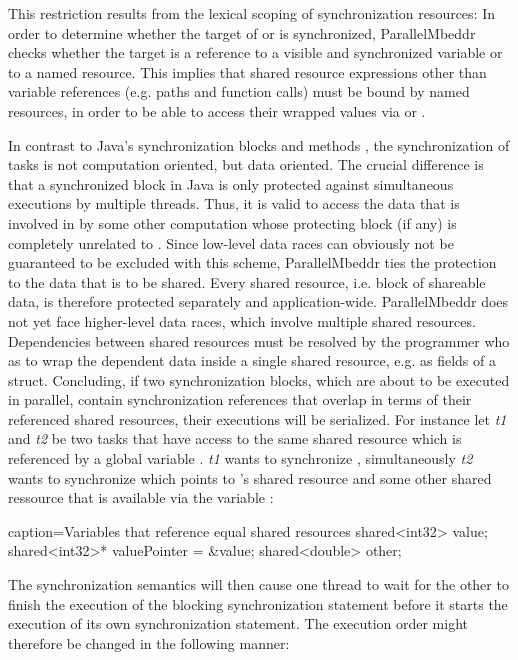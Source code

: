This restriction results from the lexical scoping of synchronization resources: In order to determine whether the target of  or  is synchronized, ParallelMbeddr checks whether the target is a reference to a visible and synchronized variable or to a named resource. This implies that shared resource expressions other than variable references (e.g. paths and function calls) must be bound by named resources, in order to be able to access their wrapped values via  or . 

In contrast to Java's synchronization blocks and methods \cite[p.~279]{JavaPerformanceTuning}, the synchronization of tasks is not computation oriented, but data oriented. The crucial difference is that a synchronized block  in Java is only protected against simultaneous executions by multiple threads. Thus, it is valid to access the data that is involved in  by some other computation whose protecting block (if any) is completely unrelated to . Since low-level data races can obviously not be guaranteed to be excluded with this scheme, ParallelMbeddr ties the protection to the data that is to be shared. Every shared resource, i.e. block of shareable data, is therefore protected separately and application-wide. ParallelMbeddr does not yet face higher-level data races, which involve multiple shared resources. Dependencies between shared resources must be resolved by the programmer who as to wrap the dependent data inside a single shared resource, e.g. as fields of a struct. Concluding, if two synchronization blocks, which are about to be executed in parallel, contain synchronization references that overlap in terms of their referenced shared resources, their executions will be serialized. For instance let \textit{t1} and \textit{t2} be two tasks that have access to the same shared resource which is referenced by a global variable . \textit{t1} wants to synchronize , simultaneously \textit{t2} wants to synchronize  which points to 's shared resource and some other shared ressource that is available via the variable :

\begin{ccode}{caption=Variables that reference equal shared resources}
shared<int32> value;
shared<int32>* valuePointer = &value;
shared<double> other;
\end{ccode}
The synchronization semantics will then cause one thread to wait for the other to finish the execution of the blocking synchronization statement before it starts the execution of its own synchronization statement. The execution order might therefore be changed in the following manner:

